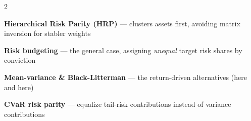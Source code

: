 \documentclass{pyportfolios-note}
\begin{document}
\begin{multicols}{2}
\begin{notebullets}
\item \textbf{Hierarchical Risk Parity (HRP)} — clusters assets first, avoiding
      matrix inversion for stabler weights
\item \textbf{Risk budgeting} — the general case, assigning \textit{unequal}
      target risk shares by conviction
\item \textbf{Mean-variance \& Black-Litterman} — the return-driven alternatives
      (here and here)
\item \textbf{CVaR risk parity} — equalize tail-risk contributions instead of
      variance contributions
\end{notebullets}
\end{multicols}
\end{document}
